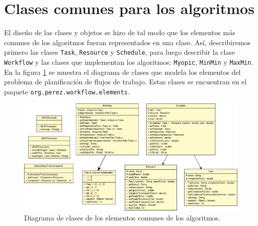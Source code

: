 \section{Clases comunes para los algoritmos}
El diseño de las clases y objetos se hizo de tal modo que los elementos más comunes de los algoritmos fueran representados en una clase. Así, describiremos primero las clases \texttt{Task}, \texttt{Resource} y \texttt{Schedule}, para luego describir la clase \texttt{Workflow} y las clases que implementan los algoritmos: \texttt{Myopic}, \texttt{MinMin} y \texttt{MaxMin}. En la figura \ref{fig:uml_class} se muestra el diagrama de clases que modela los elementos del problema de planificación de flujos de trabajo. Estas clases se encuentran en el paquete \texttt{org.perez.workflow.elements}.

\begin{figure}
\label{fig:uml_class}
\begin{center}
\includegraphics[width=1.2\textwidth,angle=90]{imagenes/elements_uml.pdf}
\end{center}
\caption{Diagrama de clases de los elementos comunes de los algoritmos.}
\end{figure}

